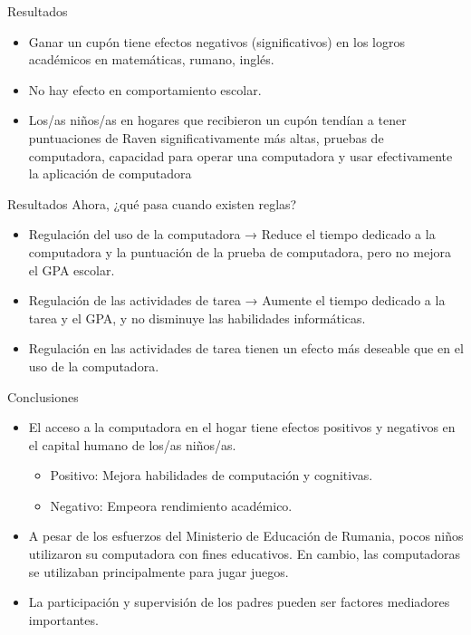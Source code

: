 \documentclass[11pt, aspectratio=169, compress]{beamer}
\begin{document}
\begin{frame}[t]{Resultados}
\begin{itemize}
\item Ganar un cupón tiene efectos negativos (significativos) en los logros académicos en matemáticas, rumano, inglés.
\item No hay efecto en comportamiento escolar. 
\item Los/as niños/as en hogares que recibieron un cupón tendían a tener puntuaciones de Raven significativamente más altas, pruebas de computadora, capacidad para operar una computadora y usar efectivamente la aplicación de computadora 		
\end{itemize}
\end{frame}
\begin{frame}[t]{Resultados}
Ahora, ¿qué pasa cuando existen reglas? 
\begin{itemize}
	\item Regulación del uso de la computadora → Reduce el tiempo dedicado a la computadora y la puntuación de la prueba de computadora, pero no mejora el GPA escolar. 
	\item Regulación de las actividades de tarea → Aumente el tiempo dedicado a la tarea y el GPA, y no disminuye las habilidades informáticas.
	\item Regulación en las actividades de tarea tienen un efecto más deseable que en el uso de la computadora. 
\end{itemize}
\end{frame}
\begin{frame}[t]{Conclusiones}
	\begin{itemize}
	\item El acceso a la computadora en el hogar tiene efectos positivos y negativos en el capital humano de los/as niños/as.
	\begin{itemize}
		\item Positivo: Mejora habilidades de computación y cognitivas. 
		\item Negativo: Empeora rendimiento académico. 	
	\end{itemize}
	\item A pesar de los esfuerzos del Ministerio de Educación de Rumania, pocos niños utilizaron su computadora con fines educativos. En cambio, las computadoras se utilizaban principalmente para jugar juegos.
	\item La participación y supervisión de los padres pueden ser factores mediadores importantes.
	\end{itemize}
\end{frame}
\end{document}

